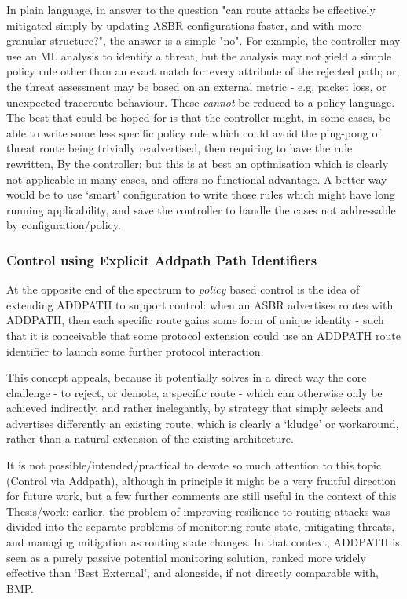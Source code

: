 \bigskip
In plain language, in answer to the question  "can route attacks be effectively mitigated simply by updating ASBR configurations faster, and with more granular structure?", the answer is a simple "no".
For example, the controller may use an ML analysis to identify a threat, but the analysis may not yield a simple policy rule other than an exact match for every attribute of the rejected path; or, the threat assessment may be based on an external metric - e.g. packet loss, or unexpected traceroute behaviour.  These \textit{cannot} be reduced to a policy language.  The best that could be hoped for is that the controller might, in some cases, be able to write some less specific policy rule which could avoid the ping-pong of threat route being trivially readvertised, then requiring to have the  rule rewritten,  By the controller; but this is at best an optimisation which is clearly not applicable in many cases, and offers no functional advantage.  A better way would be to use `smart' configuration to write those rules which might have long running applicability, and save the controller to handle the cases not addressable by configuration/policy.

\subsubsection{Control using Explicit Addpath Path Identifiers}
At the opposite end of the spectrum to \textit{policy} based control is the idea of extending ADDPATH to support control: when an ASBR advertises routes with ADDPATH, then each specific route gains some form of unique identity - such that it is conceivable that some protocol extension could use an ADDPATH route identifier to launch some further protocol interaction.

This concept appeals, because it potentially solves in a direct way the core challenge - to reject, or demote, a specific route - which can otherwise only be achieved indirectly, and rather inelegantly, by strategy that simply selects and advertises differently an existing route, which is clearly a `kludge' or workaround, rather than a natural extension of the existing architecture.

It is not possible/intended/practical to devote so much attention to this topic (Control via Addpath), although in principle it might be a very fruitful direction for future work, but a few further comments are still useful in the context of this Thesis/work:
earlier, the problem of improving resilience to routing attacks was divided into the separate problems of monitoring route state, mitigating threats, and managing mitigation as routing state changes.
In that context, ADDPATH is seen as a purely passive potential monitoring solution, ranked more widely effective than `Best External', and alongside, if not directly comparable with, BMP.

